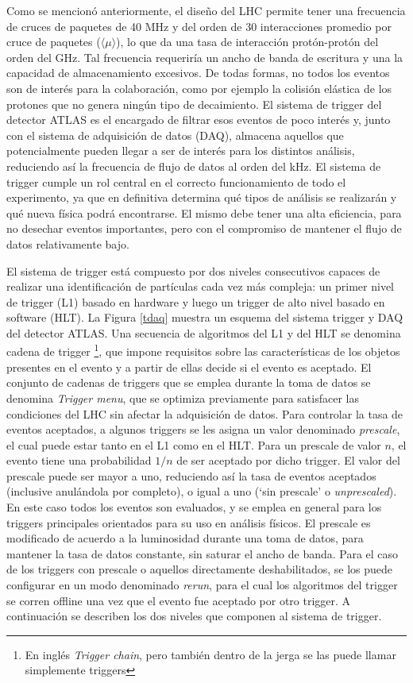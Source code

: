 Como se mencionó anteriormente, el diseño del LHC permite tener una frecuencia de cruces de paquetes de 40 MHz y del orden de 30 interacciones promedio por cruce de paquetes ($\langle \mu \rangle$), lo que da una tasa de interacción protón-protón del orden del GHz. Tal frecuencia requeriría un ancho de banda de escritura y una la capacidad de almacenamiento excesivos. De todas formas, no todos los eventos son de interés para la colaboración, como por ejemplo la colisión elástica de los protones que no genera ningún tipo de decaimiento. El sistema de trigger del detector ATLAS \cite{TRIG-2016-01} es el encargado de filtrar esos eventos de poco interés y, junto con el sistema de adquisición de datos (DAQ), almacena aquellos que potencialmente pueden llegar a ser de interés para los distintos análisis, reduciendo así la frecuencia de flujo de datos al orden del kHz. El sistema de trigger cumple un rol central en el correcto funcionamiento de todo el experimento, ya que en definitiva determina qué tipos de análisis se realizarán y qué nueva física podrá encontrarse. El mismo debe tener una alta eficiencia, para no desechar eventos importantes, pero con el compromiso de mantener el flujo de datos relativamente bajo. 

El sistema de trigger está compuesto por dos niveles consecutivos capaces de realizar una identificación de partículas cada vez más compleja: un primer nivel de trigger (L1) basado en hardware y luego un trigger de alto nivel basado en software (HLT). La Figura \ref{tdaq} muestra un esquema del sistema trigger y DAQ del detector ATLAS. Una secuencia de algoritmos del L1 y del HLT se denomina cadena de trigger \footnote{En inglés \textit{Trigger chain}, pero también dentro de la jerga se las puede llamar simplemente triggers}, que impone requisitos sobre las características de los objetos presentes en el evento y a partir de ellas decide si el evento es aceptado. El conjunto de cadenas de triggers que se emplea durante la toma de datos se denomina \textit{Trigger menu}, que se optimiza previamente para satisfacer las condiciones del LHC sin afectar la adquisición de datos. Para controlar la tasa de eventos aceptados, a algunos triggers se les asigna un valor denominado \textit{prescale}, el cual puede estar tanto en el L1 como en el HLT. Para un prescale de valor $n$, el evento tiene una probabilidad $1/n$ de ser aceptado por dicho trigger. El valor del prescale puede ser mayor a uno, reduciendo así la tasa de eventos aceptados (inclusive anulándola por completo), o igual a uno (`sin prescale' o \textit{unprescaled}). En este caso todos los eventos son evaluados, y se emplea en general para los triggers principales orientados para su uso en análisis físicos. El prescale es modificado de acuerdo a la luminosidad durante una toma de datos, para mantener la tasa de datos constante, sin saturar el ancho de banda. Para el caso de los triggers con prescale o aquellos directamente deshabilitados, se los puede configurar en un modo denominado \textit{rerun}, para el cual los algoritmos del trigger se corren offline una vez que el evento fue aceptado por otro trigger. A continuación se describen los dos niveles que componen al sistema de trigger.

